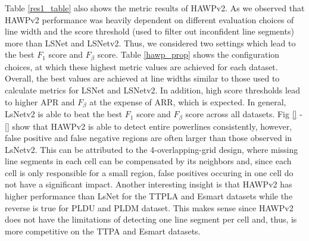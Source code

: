 \documentclass[journal]{IEEEtran}
\begin{document}
Table \ref{res1_table} also shows the metric results of HAWPv2. As we observed that HAWPv2 performance was heavily dependent on different evaluation choices of line width and the score threshold (used to filter out inconfident line segments) more than LSNet and LSNetv2. Thus, we considered two settings which lead to the best $F_1$ score and $F_\beta$ score. Table \ref{hawp_prop} shows the configuration choices, at which these highest metric values are achieved for each dataset. Overall, the best values are achieved at line widths similar to those used to calculate metrics for LSNet and LSNetv2. In addition, high score thresholds lead to higher APR and $F_\beta$ at the expense of ARR, which is expected. In general, LsNetv2 is able to beat the best $F_1$ score and $F_\beta$ score across all datasets. Fig \ref{} - \ref{} show that HAWPv2 is able to detect entire powerlines consistently, however, false positive and false negative regions are often larger than those observed in LsNetv2. This can be attributed to the 4-overlapping-grid design, where missing line segments in each cell can be compensated by its neighbors and, since each cell is only responsible for a small region, false positives occuring in one cell do not have a significant impact. Another interesting insight is that HAWPv2 has higher performance than LsNet for the TTPLA and Esmart datasets while the reverse is true for PLDU and PLDM dataset. This makes sense since HAWPv2 does not have the limitations of detecting one line segment per cell and, thus, is more competitive on the TTPA and Esmart datasets.
\end{document}
